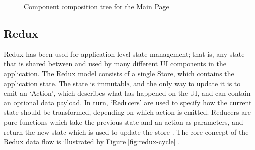 \begin{figure}[h!]
  \begin{center}
    \caption{Component composition tree for the Main Page}
    \label{fig:main-components}
  \end{center}
\end{figure}

\subsection{Redux}
Redux has been used for application-level state management; that is, any state that is shared between and used by many different UI components in the application. The Redux model consists of a single Store, which contains the application state. The state is immutable, and the only way to update it is to emit an `Action', which describes what has happened on the UI, and can contain an optional data payload. In turn, `Reducers' are used to specify how the current state should be transformed, depending on which action is emitted. Reducers are pure functions which take the previous state and an action as parameters, and return the new state which is used to update the store \cite{redux-core-concepts}. The core concept of the Redux data flow is illustrated by Figure \ref{fig:redux-cycle} \cite{redux-implementation}.


